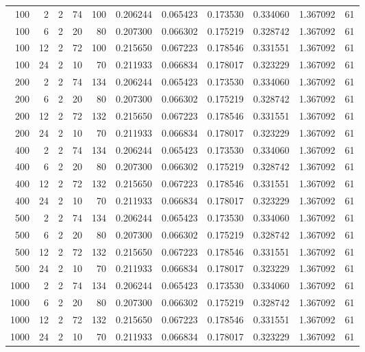 \begin{table}
\begin{tabular}{rrrrrrrrrrr}
100 & 2 & 2 & 74 & 100 & 0.206244 & 0.065423 & 0.173530 & 0.334060 & 1.367092 & 61 \\
100 & 6 & 2 & 20 & 80 & 0.207300 & 0.066302 & 0.175219 & 0.328742 & 1.367092 & 61 \\
100 & 12 & 2 & 72 & 100 & 0.215650 & 0.067223 & 0.178546 & 0.331551 & 1.367092 & 61 \\
100 & 24 & 2 & 10 & 70 & 0.211933 & 0.066834 & 0.178017 & 0.323229 & 1.367092 & 61 \\
200 & 2 & 2 & 74 & 134 & 0.206244 & 0.065423 & 0.173530 & 0.334060 & 1.367092 & 61 \\
200 & 6 & 2 & 20 & 80 & 0.207300 & 0.066302 & 0.175219 & 0.328742 & 1.367092 & 61 \\
200 & 12 & 2 & 72 & 132 & 0.215650 & 0.067223 & 0.178546 & 0.331551 & 1.367092 & 61 \\
200 & 24 & 2 & 10 & 70 & 0.211933 & 0.066834 & 0.178017 & 0.323229 & 1.367092 & 61 \\
400 & 2 & 2 & 74 & 134 & 0.206244 & 0.065423 & 0.173530 & 0.334060 & 1.367092 & 61 \\
400 & 6 & 2 & 20 & 80 & 0.207300 & 0.066302 & 0.175219 & 0.328742 & 1.367092 & 61 \\
400 & 12 & 2 & 72 & 132 & 0.215650 & 0.067223 & 0.178546 & 0.331551 & 1.367092 & 61 \\
400 & 24 & 2 & 10 & 70 & 0.211933 & 0.066834 & 0.178017 & 0.323229 & 1.367092 & 61 \\
500 & 2 & 2 & 74 & 134 & 0.206244 & 0.065423 & 0.173530 & 0.334060 & 1.367092 & 61 \\
500 & 6 & 2 & 20 & 80 & 0.207300 & 0.066302 & 0.175219 & 0.328742 & 1.367092 & 61 \\
500 & 12 & 2 & 72 & 132 & 0.215650 & 0.067223 & 0.178546 & 0.331551 & 1.367092 & 61 \\
500 & 24 & 2 & 10 & 70 & 0.211933 & 0.066834 & 0.178017 & 0.323229 & 1.367092 & 61 \\
1000 & 2 & 2 & 74 & 134 & 0.206244 & 0.065423 & 0.173530 & 0.334060 & 1.367092 & 61 \\
1000 & 6 & 2 & 20 & 80 & 0.207300 & 0.066302 & 0.175219 & 0.328742 & 1.367092 & 61 \\
1000 & 12 & 2 & 72 & 132 & 0.215650 & 0.067223 & 0.178546 & 0.331551 & 1.367092 & 61 \\
1000 & 24 & 2 & 10 & 70 & 0.211933 & 0.066834 & 0.178017 & 0.323229 & 1.367092 & 61 \\
\bottomrule
\end{tabular}
\end{table}

